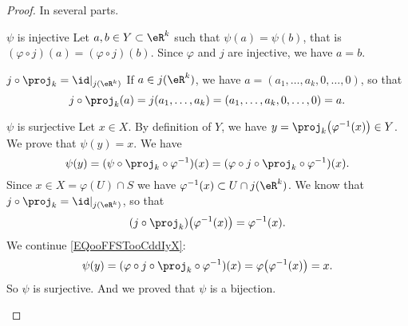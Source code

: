 \begin{proof}
    In several parts.
    \begin{subproof}
        \item[\( \psi\) is injective]
            Let \( a,b\in Y\subset \eR^k\) such that \( \psi(a)=\psi(b)\), that is \( (\varphi\circ j)(a)=(\varphi\circ j)(b)\). Since \( \varphi\) and \( j\) are injective, we have \( a=b\).
        \item[\( j\circ\proj_k=\id|_{j(\eR^k)}\)]
            If \( a\in j(\eR^k)\), we have \( a=(a_1,\ldots, a_k,0,\ldots, 0)\), so that
            \begin{equation}
                j\circ\proj_k(a)=j(a_1,\ldots, a_k)=(a_1,\ldots, a_k,0,\ldots, 0)=a.
            \end{equation}
        \item[\( \psi\) is surjective]
            Let \( x\in X\). By definition of \( Y\), we have \( y=\proj_k\big( \varphi^{-1}(x) \big)\in Y\). We prove that \( \psi(y)=x\). We have
            \begin{equation}        \label{EQooFFSTooCddIyX}
                \psi(y)=(\psi\circ\proj_k\circ\varphi^{-1})(x)=(\varphi\circ j\circ\proj_k\circ\varphi^{-1})(x).
            \end{equation}
            Since \( x\in X=\varphi(U)\cap S\) we have \( \varphi^{-1}(x)\subset U\cap j(\eR^k)\). We know that \( j\circ\proj_k=\id|_{j(\eR^k)}\), so that
            \begin{equation}
                (j\circ\proj_k)\big( \varphi^{-1}(x) \big)=\varphi^{-1}(x).
            \end{equation}
            We continue \eqref{EQooFFSTooCddIyX}:
            \begin{equation}
                \psi(y)=(\varphi\circ j\circ\proj_k\circ\varphi^{-1})(x)=\varphi\big( \varphi^{-1}(x) \big)=x.
            \end{equation}
            So \( \psi\) is surjective. And we proved that \( \psi\) is a bijection.


\end{subproof}
\end{proof}
